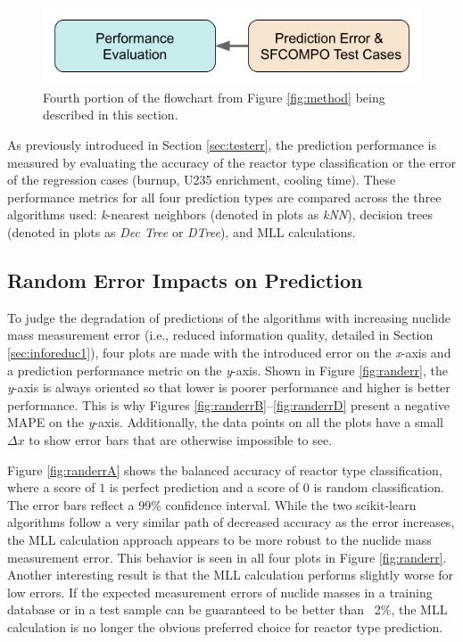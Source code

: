 
\begin{figure}[H]
  \centering
  \includegraphics[width=0.7\linewidth]{./chapters/exp1/methodology4.png}
  \caption{Fourth portion of the flowchart from Figure \ref{fig:method} being 
           described in this section.}
\end{figure}

As previously introduced in Section \ref{sec:testerr}, the prediction
performance is measured by evaluating the accuracy of the reactor type
classification or the error of the regression cases (burnup, \gls{U235}
enrichment, cooling time).  These performance metrics for all four prediction
types are compared across the three algorithms used: \textit{k}-nearest
neighbors (denoted in plots as \textit{kNN}), decision trees (denoted in plots
as \textit{Dec Tree} or \textit{DTree}), and \gls{MLL} calculations.  

\subsection{Random Error Impacts on Prediction}
\label{sec:randerr}

To judge the degradation of predictions of the algorithms with increasing
nuclide mass measurement error (i.e., reduced information quality, detailed in
Section \ref{sec:inforeduc1}), four plots are made with the introduced error on
the \textit{x}-axis and a prediction performance metric on the \textit{y}-axis.
Shown in Figure \ref{fig:randerr}, the \textit{y}-axis is always oriented so
that lower is poorer performance and higher is better performance. This is why
Figures \ref{fig:randerrB}--\ref{fig:randerrD} present a negative \gls{MAPE} on
the \textit{y}-axis. Additionally, the data points on all the plots have a
small $\Delta x$ to show error bars that are otherwise impossible to see.

Figure \ref{fig:randerrA} shows the balanced accuracy of reactor type
classification, where a score of $1$ is perfect prediction and a score of $0$
is random classification. The error bars reflect a 99\% confidence interval.
While the two scikit-learn algorithms follow a very similar path of decreased
accuracy as the error increases, the \gls{MLL} calculation approach appears to
be more robust to the nuclide mass measurement error. This behavior is seen in
all four plots in Figure \ref{fig:randerr}. Another interesting result is that
the \gls{MLL} calculation performs slightly worse for low errors. If the
expected measurement errors of nuclide masses in a training database or in a
test sample can be guaranteed to be better than ~2\%, the \gls{MLL} calculation
is no longer the obvious preferred choice for reactor type prediction.

